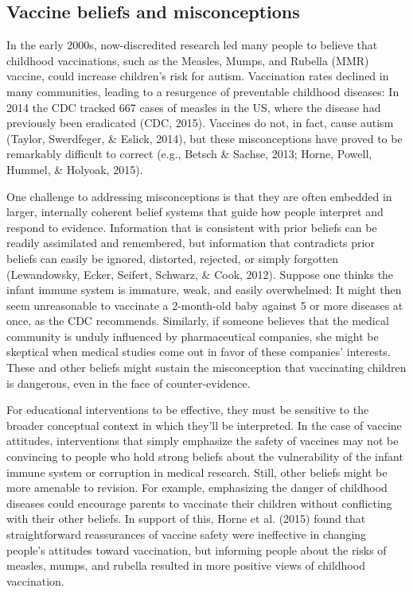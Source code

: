 \documentclass[10pt, letterpaper]{article}
\begin{document}
\subsection{Vaccine beliefs and
misconceptions}\label{vaccine-beliefs-and-misconceptions}

In the early 2000s, now-discredited research led many people to believe
that childhood vaccinations, such as the Measles, Mumps, and Rubella
(MMR) vaccine, could increase children's risk for autism. Vaccination
rates declined in many communities, leading to a resurgence of
preventable childhood diseases: In 2014 the CDC tracked 667 cases of
measles in the US, where the disease had previously been eradicated
(CDC, 2015). Vaccines do not, in fact, cause autism (Taylor, Swerdfeger,
\& Eslick, 2014), but these misconceptions have proved to be remarkably
difficult to correct (e.g., Betsch \& Sachse, 2013; Horne, Powell,
Hummel, \& Holyoak, 2015).

One challenge to addressing misconceptions is that they are often
embedded in larger, internally coherent belief systems that guide how
people interpret and respond to evidence. Information that is consistent
with prior beliefs can be readily assimilated and remembered, but
information that contradicts prior beliefs can easily be ignored,
distorted, rejected, or simply forgotten (Lewandowsky, Ecker, Seifert,
Schwarz, \& Cook, 2012). Suppose one thinks the infant immune system is
immature, weak, and easily overwhelmed: It might then seem unreasonable
to vaccinate a 2-month-old baby against 5 or more diseases at once, as
the CDC recommends. Similarly, if someone believes that the medical
community is unduly influenced by pharmaceutical companies, she might be
skeptical when medical studies come out in favor of these companies'
interests. These and other beliefs might sustain the misconception that
vaccinating children is dangerous, even in the face of counter-evidence.

For educational interventions to be effective, they must be sensitive to
the broader conceptual context in which they'll be interpreted. In the
case of vaccine attitudes, interventions that simply emphasize the
safety of vaccines may not be convincing to people who hold strong
beliefs about the vulnerability of the infant immune system or
corruption in medical research. Still, other beliefs might be more
amenable to revision. For example, emphasizing the danger of childhood
diseases could encourage parents to vaccinate their children without
conflicting with their other beliefs. In support of this, Horne et al.
(2015) found that straightforward reassurances of vaccine safety were
ineffective in changing people's attitudes toward vaccination, but
informing people about the risks of measles, mumps, and rubella resulted
in more positive views of childhood vaccination.
\end{document}
